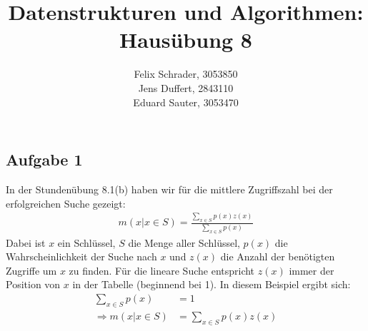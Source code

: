 \documentclass[11pt]{article}
\author{
  Felix Schrader, 3053850 \\ 
  Jens Duffert, 2843110 \\
  Eduard Sauter, 3053470
}
\title{Datenstrukturen und Algorithmen: Haus\"ubung 8}
\begin{document}
\maketitle
\subsection*{Aufgabe 1}
In der Stundenübung 8.1(b) haben wir für die mittlere Zugriffszahl bei der
erfolgreichen Suche gezeigt:
\begin{align*}
  m(x \vert x \in S) = \frac{\sum_{x \in S} p(x) z(x)}{\sum_{x \in S} p(x)}
\end{align*}
Dabei ist $x$ ein Schlüssel, $S$ die Menge aller Schlüssel, $p(x)$ die
Wahrscheinlichkeit der Suche nach $x$ und $z(x)$ die Anzahl der benötigten
Zugriffe um $x$ zu finden. Für die lineare Suche entspricht $z(x)$ immer der
Position von $x$ in der Tabelle (beginnend bei 1). In diesem Beispiel ergibt
sich:
\begin{align*}
  \sum_{x \in S} p(x) &= 1 \\
  \Rightarrow m(x \vert x \in S) &= \sum_{x \in S} p(x) z(x)
\end{align*}
\end{document}
